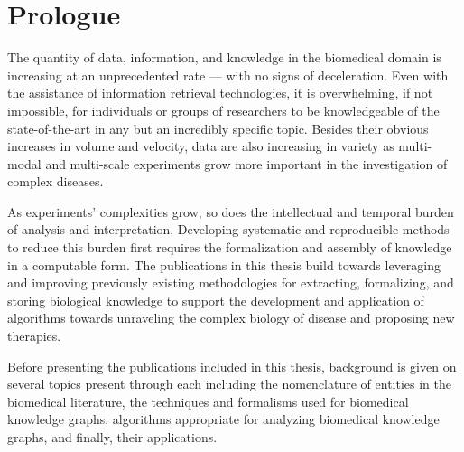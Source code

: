 \chapter{Prologue}
\label{ch:prologue}

The quantity of data, information, and knowledge in the biomedical domain is increasing at an unprecedented rate — with no signs of deceleration.
Even with the assistance of information retrieval technologies, it is overwhelming, if not impossible, for individuals or groups of researchers to be knowledgeable of the state-of-the-art in any but an incredibly specific topic.
Besides their obvious increases in volume and velocity, data are also increasing in variety as multi-modal and multi-scale experiments grow more important in the investigation of complex diseases.

As experiments' complexities grow, so does the intellectual and temporal burden of analysis and interpretation.
Developing systematic and reproducible methods to reduce this burden first requires the formalization and assembly of knowledge in a computable form.
The publications in this thesis build towards leveraging and improving previously existing methodologies for extracting, formalizing, and storing biological knowledge to support the development and application of algorithms towards unraveling the complex biology of disease and proposing new therapies.

Before presenting the publications included in this thesis, background is given on several topics present through each including the nomenclature of entities in the biomedical literature, the techniques and formalisms used for biomedical knowledge graphs, algorithms appropriate for analyzing biomedical knowledge graphs, and finally, their applications.





